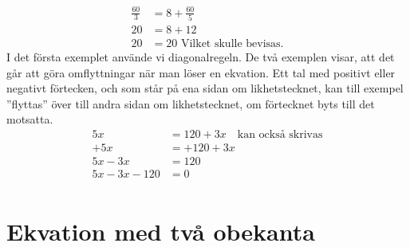 \begin{align*}
\frac{60}{3} & = 8 + \frac{60}{5}\\
          20 &= 8 + 12 \\
          20 &= 20\text{ Vilket skulle bevisas.}
\end{align*}
I det första exemplet använde vi diagonalregeln.
De två exemplen visar, att det går att göra omflyttningar när man löser en
ekvation.
Ett tal med positivt eller negativt förtecken, och som står på ena sidan om
likhetstecknet, kan till exempel ''flyttas'' över till andra sidan om likhetstecknet,
om förtecknet byts till det motsatta.
\begin{align*}
  5x &= 120 + 3x \quad \text{kan också skrivas} \\
  +5x &= +120+ 3x \\
  5x-3x &= 120 \\
  5x- 3x-120 &= 0 \\
\end{align*}

\section{Ekvation med två obekanta}

